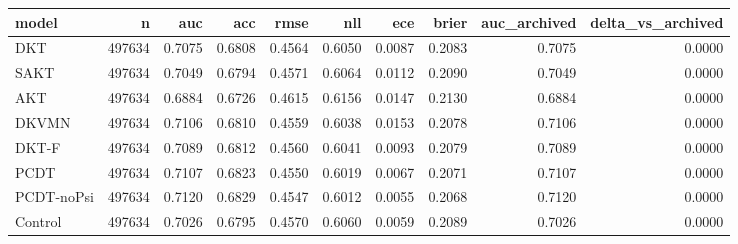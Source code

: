 \begin{tabular}{lrrrrrrrrr}
\toprule
model & n & auc & acc & rmse & nll & ece & brier & auc\_archived & delta\_vs\_archived \\
\midrule
DKT & 497634 & 0.7075 & 0.6808 & 0.4564 & 0.6050 & 0.0087 & 0.2083 & 0.7075 & 0.0000 \\
SAKT & 497634 & 0.7049 & 0.6794 & 0.4571 & 0.6064 & 0.0112 & 0.2090 & 0.7049 & 0.0000 \\
AKT & 497634 & 0.6884 & 0.6726 & 0.4615 & 0.6156 & 0.0147 & 0.2130 & 0.6884 & 0.0000 \\
DKVMN & 497634 & 0.7106 & 0.6810 & 0.4559 & 0.6038 & 0.0153 & 0.2078 & 0.7106 & 0.0000 \\
DKT-F & 497634 & 0.7089 & 0.6812 & 0.4560 & 0.6041 & 0.0093 & 0.2079 & 0.7089 & 0.0000 \\
PCDT & 497634 & 0.7107 & 0.6823 & 0.4550 & 0.6019 & 0.0067 & 0.2071 & 0.7107 & 0.0000 \\
PCDT-noPsi & 497634 & 0.7120 & 0.6829 & 0.4547 & 0.6012 & 0.0055 & 0.2068 & 0.7120 & 0.0000 \\
Control & 497634 & 0.7026 & 0.6795 & 0.4570 & 0.6060 & 0.0059 & 0.2089 & 0.7026 & 0.0000 \\
\bottomrule
\end{tabular}

